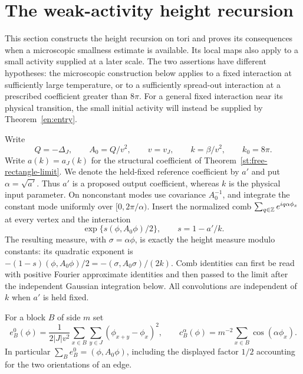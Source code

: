 \section{The weak-activity height recursion}
\label{wh:section}

This section constructs the height recursion on tori and proves its
consequences when a microscopic smallness estimate is available.  Its local
maps also apply to a small activity supplied at a later scale.  The two
assertions have different hypotheses: the microscopic construction below
applies to a fixed interaction at sufficiently large temperature, or to a
sufficiently spread-out interaction at a prescribed coefficient greater than
$8\pi$.  For a general fixed interaction near its physical transition, the
small initial activity will instead be supplied by Theorem~\ref{en:entry}.

Write
\begin{equation}\label{wh:conventions}
 Q=-\Delta_J,\qquad A_0=Q/v^2,\qquad v=v_J,\qquad
 k=\beta/v^2,\qquad k_0=8\pi.
\end{equation}
Write $a(k)=a_J(k)$ for the structural coefficient of
Theorem~\ref{st:free-rectangle-limit}.
We denote the held-fixed reference coefficient by $a'$ and put
$\alpha=\sqrt{a'}$.  Thus $a'$ is a proposed output coefficient, whereas
$k$ is the physical input parameter.  On nonconstant modes use covariance
$A_0^{-1}$, and integrate the constant mode uniformly over
$[0,2\pi/\alpha)$.  Insert the normalized comb
$\sum_{q\in\mathbb Z}e^{iq\alpha\phi_x}$ at every vertex and the interaction
\begin{equation}\label{wh:compensation}
 \exp\{s(\phi,A_0\phi)/2\},\qquad s=1-a'/k.
\end{equation}
The resulting measure, with $\sigma=\alpha\phi$, is exactly the height
measure modulo constants: its quadratic exponent is
$-(1-s)(\phi,A_0\phi)/2=-(\sigma,A_0\sigma)/(2k)$.
Comb identities can first be read with positive Fourier approximate identities and then
passed to the limit after the independent Gaussian integration below.
All convolutions are independent of $k$ when $a'$ is held fixed.

For a block $B$ of side $m$ set
\begin{equation}\label{wh:singletons}
 e_B^0(\phi)=\frac1{2|J|v^2}\sum_{x\in B}\sum_{y\in J}
       (\phi_{x+y}-\phi_x)^2,
 \qquad c_B^\alpha(\phi)=m^{-2}\sum_{x\in B}\cos(\alpha\phi_x).
\end{equation}
In particular $\sum_Be_B^0=(\phi,A_0\phi)$, including the displayed
factor $1/2$ accounting for the two orientations of an edge.


